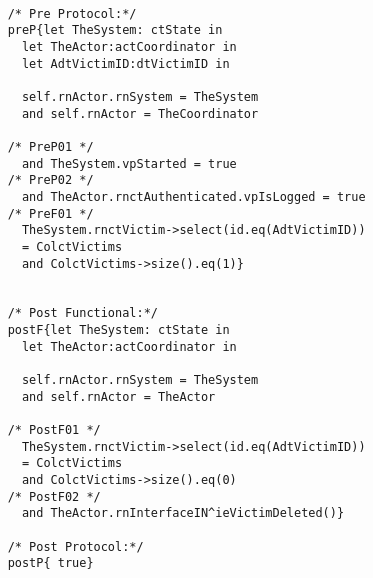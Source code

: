 	\scriptsize
	\vspace{0.5cm}
	\begin{lstlisting}[style=MessirStyle,firstnumber=auto,captionpos=b,caption={\msrmessir (MCL-oriented) specification of the operation \emph{oeDeleteVictim}.},label=OM-actCoordinator-oeDeleteVictim-MCL-LST]

	/* Pre Protocol:*/ 
	preP{let TheSystem: ctState in
	  let TheActor:actCoordinator in
	  let AdtVictimID:dtVictimID in
	  
	  self.rnActor.rnSystem = TheSystem
	  and self.rnActor = TheCoordinator
	  
	/* PreP01 */
	  and TheSystem.vpStarted = true
	/* PreP02 */
	  and TheActor.rnctAuthenticated.vpIsLogged = true
	/* PreF01 */
	  TheSystem.rnctVictim->select(id.eq(AdtVictimID))
	  = ColctVictims
	  and ColctVictims->size().eq(1)}
	
	
	/* Post Functional:*/ 
	postF{let TheSystem: ctState in
	  let TheActor:actCoordinator in
	  
	  self.rnActor.rnSystem = TheSystem
	  and self.rnActor = TheActor
	  
	/* PostF01 */
	  TheSystem.rnctVictim->select(id.eq(AdtVictimID))
	  = ColctVictims
	  and ColctVictims->size().eq(0)
	/* PostF02 */
	  and TheActor.rnInterfaceIN^ieVictimDeleted()}
	
	/* Post Protocol:*/ 
	postP{ true}
	
	\end{lstlisting}
	\normalsize 
	
	
	
	





